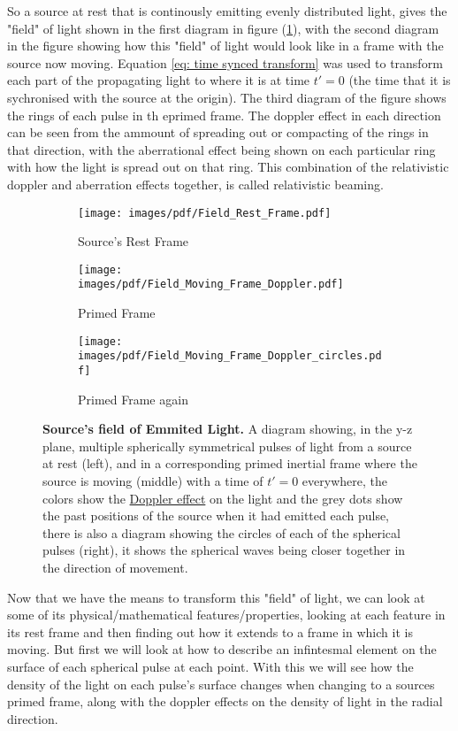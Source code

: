 So a source at rest that is continously emitting evenly distributed light, gives the "field" of light shown in the first diagram in figure (\ref{fig: full field transformation}), with the second diagram in the figure showing how this "field" of light would look like in a frame with the source now moving.
Equation \eqref{eq: time synced transform} was used to transform each part of the propagating light to where it is at time $t'=0$ (the time that it is sychronised with the source at the origin).
The third diagram of the figure shows the rings of each pulse in th eprimed frame.
The doppler effect in each direction can be seen from the ammount of spreading out or compacting of the rings in that direction, with the aberrational effect being shown on each particular ring with how the light is spread out on that ring.
This combination of the relativistic doppler and aberration effects together, is called relativistic beaming.


\begin{figure}[H]
	\centering
	\begin{subfigure}{.3\textwidth}
		\centering
		\texttt{[image: images/pdf/Field\_Rest\_Frame.pdf]}
		\caption{Source's Rest Frame}
	\end{subfigure}
	\begin{subfigure}{.3\textwidth}
		\centering
		\texttt{[image: images/pdf/Field\_Moving\_Frame\_Doppler.pdf]}
		\caption{Primed Frame}
	\end{subfigure}
	\begin{subfigure}{.3\textwidth}
		\centering
		\texttt{[image: images/pdf/Field\_Moving\_Frame\_Doppler\_circles.pdf]}
		\caption{Primed Frame again}
	\end{subfigure}
	\caption{\textbf{Source's field of Emmited Light.} A diagram showing, in the y-z plane, multiple spherically symmetrical pulses of light from a source at rest (left), and in a corresponding primed inertial frame where the source is moving (middle) with a time of $t'=0$ everywhere, the colors show the \protect\hyperlink{def-doppler-effect}{Doppler effect} on the light and the grey dots show the past positions of the source when it had emitted each pulse, there is also a diagram showing the circles of each of the spherical pulses (right), it shows the spherical waves being closer together in the direction of movement.}
	\label{fig: full field transformation}
\end{figure}

Now that we have the means to transform this "field" of light, we can look at some of its physical/mathematical features/properties, looking at each feature in its rest frame and then finding out how it extends to a frame in which it is moving.
But first we will look at how to describe an infintesmal element on the surface of each spherical pulse at each point.
With this we will see how the density of the light on each pulse's surface changes when changing to a sources primed frame, along with the doppler effects on the density of light in the radial direction.

